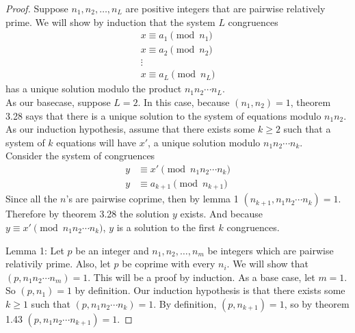 \documentclass[12pt,leqno]{article}
\numberwithin{equation}{section}
\theoremstyle{definition}
\begin{document}
\begin{proof}[Proof]
Suppose $n_1, n_2, \hdots, n_L$ are positive integers that are pairwise relatively prime.  We will show by induction that the system $L$ congruences
\[ \begin{array}{c}
x \equiv a_1 \pmod{n_1} \\
x \equiv a_2 \pmod{n_2} \\
\vdots \\
x \equiv a_L \pmod{n_L} \end{array} \]
has a unique solution modulo the product $n_1 n_2 \cdots n_L$.\\
As our basecase, suppose $L = 2$.  In this case, because $(n_1, n_2) = 1$, theorem 3.28 says that there is a unique solution to the system of equations modulo $n_1 n_2$.\\
As our induction hypothesis, assume that there exists some $k \geq 2$ such that a system of $k$ equations will have $x'$, a unique solution modulo $n_1 n_2 \cdots n_k$.\\

Consider the system of congruences
\begin{align*}
y &\equiv x' \pmod{n_1 n_2 \cdots n_k}\\
y &\equiv a_{k+1} \pmod{n_{k+1}}
\end{align*}
Since all the $n$'s are pairwise coprime, then by lemma 1 $(n_{k+1}, n_1 n_2 \cdots n_k) = 1$.  Therefore by theorem 3.28 the solution $y$ exists.   And because $y \equiv  x' \pmod{n_1 n_2 \cdots n_k}$, $y$ is a solution to the first $k$ congruences.


Lemma 1: Let $p$ be an integer and $n_1, n_2, \ldots , n_m$ be integers which are pairwise relativily prime.  Also, let $p$ be coprime with every $n_i$.  We will show that $(p, n_1 n_2 \cdots n_m) = 1$.  This will be a proof by induction.  As a base case, let $m = 1$.  So $(p, n_1) = 1$ by definition.  Our induction hypothesis is that there exists some $k \geq 1$ such that $(p, n_1 n_2 \cdots n_k) = 1$.  By definition, $(p, n_{k+1}) = 1$, so by theorem 1.43 $(p, n_1 n_2 \cdots n_{k+1}) = 1$. 

\end{proof}
\end{document}
